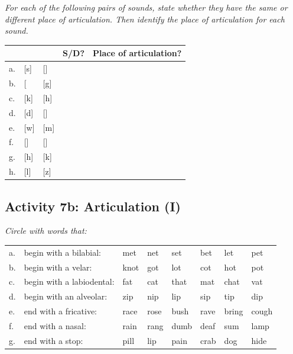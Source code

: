 \documentclass[11pt, oneside]{article}   	%
\begin{document}
{\itshape For each of the following pairs of sounds, state whether they have the same or different place of articulation. Then identify the place of articulation for each sound.}

\begin{center}
\begin{tabular}{ l l l || l | l }
	&		&				&	S/D?		&	Place of articulation? \\ \hline
a.	& 	[s]	&	[\textipa{S}]	&			&					\\
b.	&	[\textipa{N}	&	[g]	&			&					\\
c.	&	[k]			&	[h]	&			&					\\
d.	&	[d]			&	[\textipa{R}]	&			&					\\
e.	&	[w]			&	[m]	&			&					\\
f.	&	[\textipa{Z}]	&	[\textteshlig]	&			&					\\
g.	&	[h]			&	[k]			&			&					\\
h.	&	[l]			&	[z]			&			&					\\
\end{tabular}
\end{center}

\subsection{Activity 7b: Articulation (I)}

{\itshape Circle with words that:}

\begin{center}
\begin{tabular}{ l l l l l l l l }
a. &	begin with a bilabial: & met & net & set & bet & let & pet \\
b. &  begin with a velar:	& knot & got & lot & cot & hot & pot \\
c. &  begin with a labiodental: & fat & cat & that & mat & chat & vat \\
d. & begin with an alveolar: & zip & nip & lip & sip & tip & dip \\
e. & end with a fricative: & race & rose & bush & rave & bring & cough \\
f.  & end with a nasal: & rain & rang & dumb & deaf & sum & lamp \\
g. & end with a stop: & pill & lip & pain & crab & dog & hide \\
\end{tabular}
\end{center}

\newpage
\end{document}

